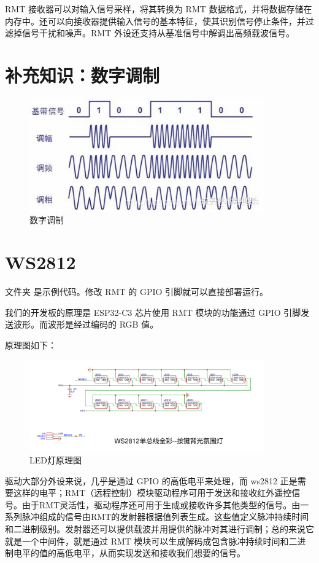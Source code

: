 \documentclass[lang=cn,newtx,10pt,scheme=chinese]{elegantbook}
\begin{document}
RMT 接收器可以对输入信号采样，将其转换为 RMT 数据格式，并将数据存储在内存中。还可以向接收器提供输入信号的基本特征，使其识别信号停止条件，并过滤掉信号干扰和噪声。RMT 外设还支持从基准信号中解调出高频载波信号。

\section{补充知识：数字调制}

\begin{figure}[!htb]
\centering
\includegraphics[width=0.9\textwidth]{RMT-4.png}
\caption{数字调制}
\end{figure}

\section{WS2812}

文件夹  是示例代码。修改 RMT 的 GPIO 引脚就可以直接部署运行。

我们的开发板的原理是 ESP32-C3 芯片使用 RMT 模块的功能通过 GPIO 引脚发送波形。而波形是经过编码的 RGB 值。

原理图如下：

\begin{figure}[!htb]
\centering
\includegraphics[width=0.9\textwidth]{ws2812.png}
\caption{LED灯原理图}
\end{figure}

驱动大部分外设来说，几乎是通过 GPIO 的高低电平来处理，而 ws2812 正是需要这样的电平；RMT（远程控制）模块驱动程序可用于发送和接收红外遥控信号。由于RMT灵活性，驱动程序还可用于生成或接收许多其他类型的信号。由一系列脉冲组成的信号由RMT的发射器根据值列表生成。这些值定义脉冲持续时间和二进制级别。发射器还可以提供载波并用提供的脉冲对其进行调制；总的来说它就是一个中间件，就是通过 RMT 模块可以生成解码成包含脉冲持续时间和二进制电平的值的高低电平，从而实现发送和接收我们想要的信号。
\end{document}
